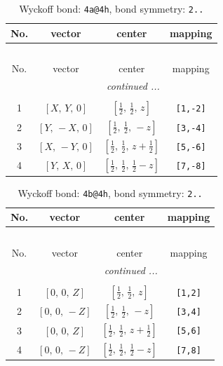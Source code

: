 \documentclass[fleqn,8pt]{jsarticle}
\begin{document}
\begin{longtable}{cccc}
\caption{Wyckoff bond: {\tt 4a@4h}, bond symmetry: {\tt 2..}}
 \\
 \hline \hline
No. & vector & center & mapping \\ \hline \endfirsthead

\multicolumn{3}{l}{\tablename\ \thetable{}} \\
 \hline \hline
No. & vector & center & mapping \\ \hline \endhead

 \hline \hline
\multicolumn{3}{r}{\footnotesize\it continued ...} \\ \endfoot

 \hline \hline
\multicolumn{3}{r}{} \\ \endlastfoot

1 & $\left[ X,\, Y,\, 0 \right]$ & $\left[ \frac{1}{2},\, \frac{1}{2},\, z \right]$ & {\tt [1,-2]} \\ \hline
2 & $\left[ Y,\, - X,\, 0 \right]$ & $\left[ \frac{1}{2},\, \frac{1}{2},\, - z \right]$ & {\tt [3,-4]} \\ \hline
3 & $\left[ X,\, - Y,\, 0 \right]$ & $\left[ \frac{1}{2},\, \frac{1}{2},\, z + \frac{1}{2} \right]$ & {\tt [5,-6]} \\ \hline
4 & $\left[ Y,\, X,\, 0 \right]$ & $\left[ \frac{1}{2},\, \frac{1}{2},\, \frac{1}{2} - z \right]$ & {\tt [7,-8]} \\
\end{longtable}
\renewcommand{\arraystretch}{1.2}
\begin{longtable}{cccc}
\caption{Wyckoff bond: {\tt 4b@4h}, bond symmetry: {\tt 2..}}
 \\
 \hline \hline
No. & vector & center & mapping \\ \hline \endfirsthead

\multicolumn{3}{l}{\tablename\ \thetable{}} \\
 \hline \hline
No. & vector & center & mapping \\ \hline \endhead

 \hline \hline
\multicolumn{3}{r}{\footnotesize\it continued ...} \\ \endfoot

 \hline \hline
\multicolumn{3}{r}{} \\ \endlastfoot

1 & $\left[ 0,\, 0,\, Z \right]$ & $\left[ \frac{1}{2},\, \frac{1}{2},\, z \right]$ & {\tt [1,2]} \\ \hline
2 & $\left[ 0,\, 0,\, - Z \right]$ & $\left[ \frac{1}{2},\, \frac{1}{2},\, - z \right]$ & {\tt [3,4]} \\ \hline
3 & $\left[ 0,\, 0,\, Z \right]$ & $\left[ \frac{1}{2},\, \frac{1}{2},\, z + \frac{1}{2} \right]$ & {\tt [5,6]} \\ \hline
4 & $\left[ 0,\, 0,\, - Z \right]$ & $\left[ \frac{1}{2},\, \frac{1}{2},\, \frac{1}{2} - z \right]$ & {\tt [7,8]} \\
\end{longtable}
\end{document}
